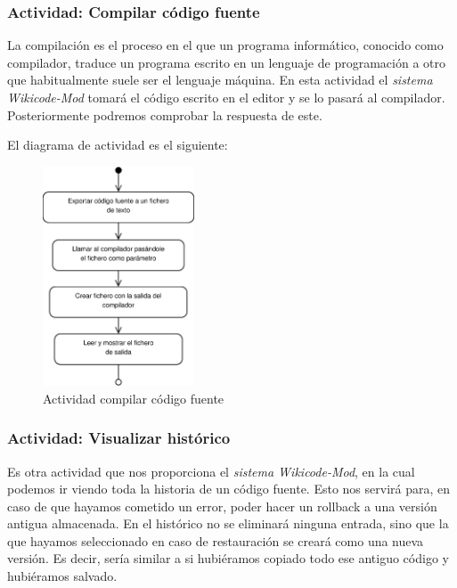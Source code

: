 \newpage

\subsubsection{Actividad: Compilar código fuente}

La compilación es el proceso en el que un programa informático, conocido como compilador, traduce un programa escrito en un lenguaje de programación a otro que habitualmente suele ser el lenguaje máquina. En esta actividad el \emph{sistema Wikicode-Mod} tomará el código escrito en el editor y se lo pasará al compilador. Posteriormente podremos comprobar la respuesta de este.

El diagrama de actividad es el siguiente:

\begin{figure}[h]
	\centering
	\includegraphics[width=0.4\textwidth]{./img/DiagramaA5.eps}
	\caption{Actividad compilar código fuente}
\end{figure}

\newpage
\subsubsection{Actividad: Visualizar histórico}

Es otra actividad que nos proporciona el \emph{sistema Wikicode-Mod}, en la cual podemos ir viendo toda la historia de un código fuente. Esto nos servirá para, en caso de que hayamos cometido un error, poder hacer un rollback a una versión antigua almacenada. En el histórico no se eliminará ninguna entrada, sino que la que hayamos seleccionado en caso de restauración se creará como una nueva versión. Es decir, sería similar a si hubiéramos copiado todo ese antiguo código y hubiéramos salvado.

